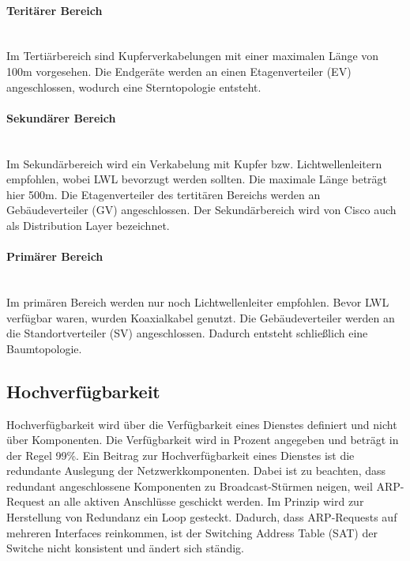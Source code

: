 \paragraph{Teritärer Bereich}~\\

\noindent Im Tertiärbereich sind Kupferverkabelungen mit einer maximalen Länge von 100m vorgesehen. Die Endgeräte werden an einen Etagenverteiler (EV) angeschlossen, wodurch eine Sterntopologie entsteht.

\paragraph{Sekundärer Bereich}~\\

\noindent Im Sekundärbereich wird ein Verkabelung mit Kupfer bzw. Lichtwellenleitern empfohlen, wobei LWL bevorzugt werden sollten. Die maximale Länge beträgt hier 500m. Die Etagenverteiler des tertitären Bereichs werden an Gebäudeverteiler (GV) angeschlossen. Der Sekundärbereich wird von Cisco auch als Distribution Layer bezeichnet.

\paragraph{Primärer Bereich}~\\

\noindent Im primären Bereich werden nur noch Lichtwellenleiter empfohlen. Bevor LWL verfügbar waren, wurden Koaxialkabel genutzt. Die Gebäudeverteiler werden an die Standortverteiler (SV) angeschlossen. Dadurch entsteht schließlich eine Baumtopologie.

\subsection{Hochverfügbarkeit}

Hochverfügbarkeit wird über die Verfügbarkeit eines Dienstes definiert und nicht über Komponenten. Die Verfügbarkeit wird in Prozent angegeben und beträgt in der Regel 99\%. Ein Beitrag zur Hochverfügbarkeit eines Dienstes ist die redundante Auslegung der Netzwerkkomponenten. Dabei ist zu beachten, dass redundant angeschlossene Komponenten zu Broadcast-Stürmen neigen, weil ARP-Request an alle aktiven Anschlüsse geschickt werden. Im Prinzip wird zur Herstellung von Redundanz ein Loop gesteckt. Dadurch, dass ARP-Requests auf mehreren Interfaces reinkommen, ist der Switching Address Table (SAT) der Switche nicht konsistent und ändert sich ständig.

